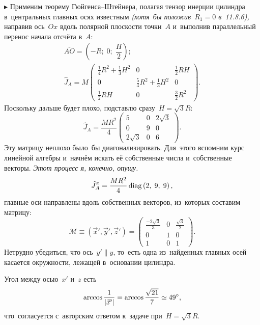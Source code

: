 \documentclass{weekly}
\begin{document}
$\blacktriangleright$ Применим теорему Гюйгенса--Штейнера,
полагая тензор инерции цилиндра в~центральных главных осях известным
\emph{(хотя~бы положив~$R_1 = 0$ в~11.8.6),} направив
ось~$Ox$ вдоль полярной плоскости точки~$A$ и~выполнив параллельный
перенос начала отсчёта в~$A$:
\begin{gather}
    \overline{AO} = \left(-R; \; 0; \; \dfrac{H}{2}\right);
\\
    \hat J_A = M
            \begin{pmatrix}
                \frac{1}{4} R^2 + \frac{1}{3} H^2 & 0 & \frac{1}{2} RH \\
                0 & \frac{5}{4} R^2 + \frac{1}{3} H^2 & 0 \\
                \frac{1}{2} RH & 0 & \frac{3}{2} R^2
            \end{pmatrix}.
\end{gather}
Поскольку дальше будет плохо, подставлю сразу~$H = \sqrt{3}R$:
\begin{equation}
    \hat J_A = \frac{MR^2}{4}
            \begin{pmatrix}
                5 & 0 & 2\sqrt{3} \\
                0 & 9 & 0 \\
                2\sqrt{3} & 0 & 6
            \end{pmatrix}.
\end{equation}
Эту матрицу неплохо было~бы диагонализировать. Для~этого вспомним
курс линейной алгебры и~начнём искать её собственные числа
и~собственные векторы. \emph{Этот процесс я, конечно, опущу.}
\begin{gather}
    \hat J_A^\pi = \frac{MR^2}{4} \operatorname{diag} \left(2, \; 9, \; 9\right),
\end{gather}
главные оси направлены вдоль собственных векторов, из~которых
составим матрицу:
\begin{equation}
    \mathcal{M} \equiv \left(\vec x', \vec y', \vec z'\right)
        = \begin{pmatrix}
            \frac{-2\sqrt{3}}{3} & 0 & \frac{\sqrt{3}}{2} \\
            0 & 1 & 0 \\
            1 & 0 & 1
        \end{pmatrix}.
    \label{11.11:M}
\end{equation}
Нетрудно убедиться, что ось~$y' \parallel y$, то~есть одна из~найденных
главных осей касается окружности, лежащей в~основании цилиндра.

Угол между осью~$x'$ и~$z$ есть
\begin{equation}
    \arccos \frac{1}{\left| \vec x' \right|} = \arccos \frac{\sqrt{21}}{7}
        \simeq 49^\circ,
\end{equation}
что~согласуется с~авторским ответом к~задаче при~$H = \sqrt{3}R$.
\end{document}
